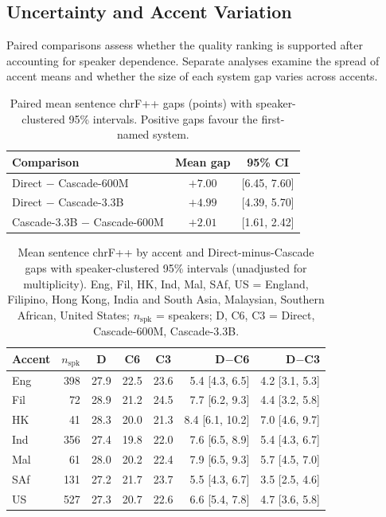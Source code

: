 \subsection{Uncertainty and Accent Variation}
\label{sec:statistical-results}

Paired comparisons assess whether the quality ranking is supported after
accounting for speaker dependence. Separate analyses examine the spread of
accent means and whether the size of each system gap varies across accents.

\begin{table}[t]
\caption{Paired mean sentence chrF++ gaps (points) with speaker-clustered 95\% intervals. Positive gaps favour the first-named system.}
\label{tab:paired-gaps}
\centering
\small
\begin{tabular}{lcc}
\toprule
Comparison & Mean gap & 95\% CI \\
\midrule
Direct $-$ Cascade-600M & $+7.00$ & [6.45, 7.60] \\
Direct $-$ Cascade-3.3B & $+4.99$ & [4.39, 5.70] \\
Cascade-3.3B $-$ Cascade-600M & $+2.01$ & [1.61, 2.42] \\
\bottomrule
\end{tabular}
\end{table}

\begin{table}[t]
\caption{Mean sentence chrF++ by accent and Direct-minus-Cascade gaps with speaker-clustered 95\% intervals (unadjusted for multiplicity). Eng, Fil, HK, Ind, Mal, SAf, US = England, Filipino, Hong Kong, India and South Asia, Malaysian, Southern African, United States; $n_{\mathrm{spk}}$ = speakers; D, C6, C3 = Direct, Cascade-600M, Cascade-3.3B.}
\label{tab:accent-gaps}
\centering
\footnotesize
\setlength{\tabcolsep}{3pt}
\begin{tabular}{lrcccrr}
\toprule
Accent & $n_{\mathrm{spk}}$ & D & C6 & C3 & D$-$C6 & D$-$C3 \\
\midrule
Eng & 398 & 27.9 & 22.5 & 23.6 & 5.4 [4.3, 6.5] & 4.2 [3.1, 5.3] \\
Fil & 72 & 28.9 & 21.2 & 24.5 & 7.7 [6.2, 9.3] & 4.4 [3.2, 5.8] \\
HK & 41 & 28.3 & 20.0 & 21.3 & 8.4 [6.1, 10.2] & 7.0 [4.6, 9.7] \\
Ind & 356 & 27.4 & 19.8 & 22.0 & 7.6 [6.5, 8.9] & 5.4 [4.3, 6.7] \\
Mal & 61 & 28.0 & 20.2 & 22.4 & 7.9 [6.5, 9.3] & 5.7 [4.5, 7.0] \\
SAf & 131 & 27.2 & 21.7 & 23.7 & 5.5 [4.3, 6.7] & 3.5 [2.5, 4.6] \\
US & 527 & 27.3 & 20.7 & 22.6 & 6.6 [5.4, 7.8] & 4.7 [3.6, 5.8] \\
\bottomrule
\end{tabular}
\end{table}

